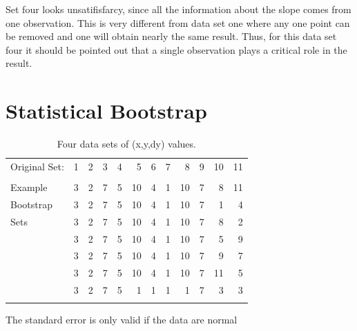 \documentclass[10pt,aps,prc,twocolumn]{revtex4-1}
\begin{document}
\begin{appendix}
Set four looks unsatifisfarcy, since all the information about the slope comes
from one observation.   This is very different from data set one where any one point
can be removed and one will obtain nearly the same result.   Thus, for this data set
four it should be pointed out that a single observation plays a critical role
in the result.

\section{Statistical Bootstrap}

\begin{table}[htb]
\caption{Four data sets of (x,y,dy) values.}
\begin{tabular}{lrrrrrrrrrrr}
Original Set: & 1 & 2 & 3 & 4 & 5 & 6 & 7 & 8 & 9 & 10 & 11 \\
 & & & & & & & & & & & \\
Example   & 3 & 2 & 7 & 5 & 10 & 4 & 1 & 10 & 7 & 8  & 11 \\
Bootstrap & 3 & 2 & 7 & 5 & 10 & 4 & 1 & 10 & 7 & 1  & 4 \\
Sets      & 3 & 2 & 7 & 5 & 10 & 4 & 1 & 10 & 7 & 8  & 2 \\
          & 3 & 2 & 7 & 5 & 10 & 4 & 1 & 10 & 7 & 5  & 9 \\
          & 3 & 2 & 7 & 5 & 10 & 4 & 1 & 10 & 7 & 9  & 7 \\
          & 3 & 2 & 7 & 5 & 10 & 4 & 1 & 10 & 7 & 11 & 5 \\
          & 3 & 2 & 7 & 5 & 1  & 1 & 1 & 1  & 7 & 3  & 3 \\ \hline
 & & & & & & & & & & & \\
\end{tabular}
\label{bootquartet}
\end{table}

The standard error is only valid if the data are normal

%

\end{appendix}



\end{document}
